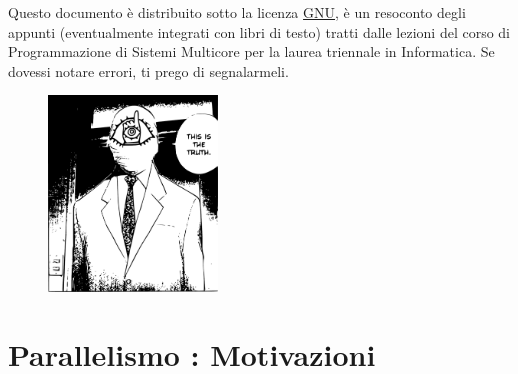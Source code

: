 \documentclass[10pt, letterpaper]{report}
\begin{document}
\newpage
\pagecolor{cartaRiciclata}%
\large
Questo documento è distribuito sotto la licenza 
\color{blue}\href{https://www.gnu.org/licenses/fdl-1.3.txt}{GNU}\color{black},  
è un resoconto degli appunti (eventualmente integrati con libri di testo) tratti dalle lezioni del corso di Programmazione di Sistemi Multicore
\hphantom{a}per la laurea 
triennale in Informatica. Se dovessi notare errori, ti prego di segnalarmeli.
\vfill
\begin{figure}[h!]
    \raggedright
    \includegraphics[width=0.4\textwidth,right ]{../../../preamble/tomodachi.pdf} 
\end{figure}
\newpage %
\normalsize
\tableofcontents 
\newpage

\fancyhf{}
\fancyhead[L]{\nouppercase{\leftmark}}
\fancyfoot[C]{\thepage}



\chapter{Parallelismo : Motivazioni}
\end{document}
